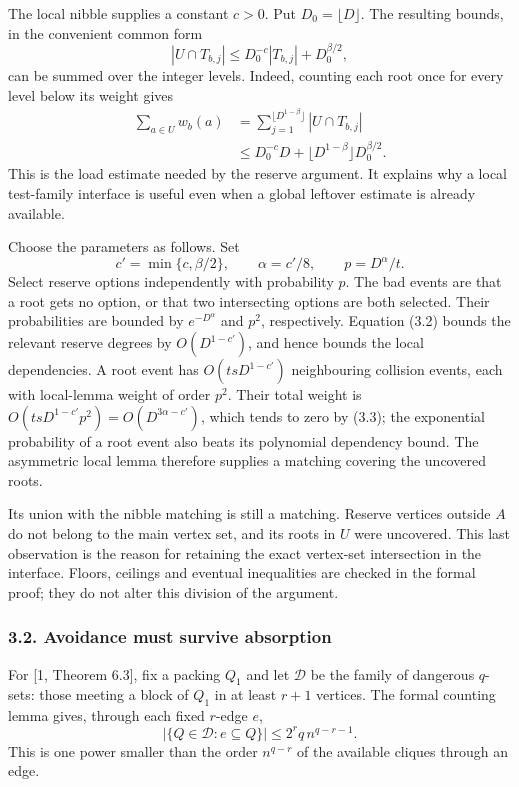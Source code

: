 \documentclass[english,11pt,a4paper]{article}
\begin{document}
The local nibble supplies a constant \(c>0\). Put \(D_0=\lfloor D\rfloor\). The resulting bounds, in the convenient common form \[|U\cap T_{b,j}|
\le D_0^{-c}|T_{b,j}|+D_0^{\beta/2},\] can be summed over the integer levels. Indeed, counting each root once for every level below its weight gives \[\begin{aligned}
\sum_{a\in U}w_b(a)
&=\sum_{j=1}^{\lfloor D^{1-\beta}\rfloor}|U\cap T_{b,j}|\\
&\le D_0^{-c}D+
 \lfloor D^{1-\beta}\rfloor D_0^{\beta/2}.
\end{aligned}
\tag{3.2}\] This is the load estimate needed by the reserve argument. It explains why a local test-family interface is useful even when a global leftover estimate is already available.

Choose the parameters as follows. Set \[c'=\min\{c,\beta/2\},\qquad
\alpha=c'/8,\qquad p=D^\alpha/t.
\tag{3.3}\] Select reserve options independently with probability \(p\). The bad events are that a root gets no option, or that two intersecting options are both selected. Their probabilities are bounded by \(e^{-D^\alpha}\) and \(p^2\), respectively. Equation (3.2) bounds the relevant reserve degrees by \(O(D^{1-c'})\), and hence bounds the local dependencies. A root event has \(O(t s D^{1-c'})\) neighbouring collision events, each with local-lemma weight of order \(p^2\). Their total weight is \(O(t s D^{1-c'}p^2)=O(D^{3\alpha-c'})\), which tends to zero by (3.3); the exponential probability of a root event also beats its polynomial dependency bound. The asymmetric local lemma therefore supplies a matching covering the uncovered roots.

Its union with the nibble matching is still a matching. Reserve vertices outside \(A\) do not belong to the main vertex set, and its roots in \(U\) were uncovered. This last observation is the reason for retaining the exact vertex-set intersection in the interface. Floors, ceilings and eventual inequalities are checked in the formal proof; they do not alter this division of the argument.


\subsubsection{3.2. Avoidance must survive absorption}\label{avoidance-must-survive-absorption}

For {[}1, Theorem 6.3{]}, fix a packing \(Q_1\) and let \(\mathcal D\) be the family of dangerous \(q\)-sets: those meeting a block of \(Q_1\) in at least \(r+1\) vertices. The formal counting lemma gives, through each fixed \(r\)-edge \(e\), \[|\{Q\in\mathcal D:e\subseteq Q\}|
\le 2^r q\,n^{q-r-1}.
\tag{3.4}\] This is one power smaller than the order \(n^{q-r}\) of the available cliques through an edge.
\end{document}
